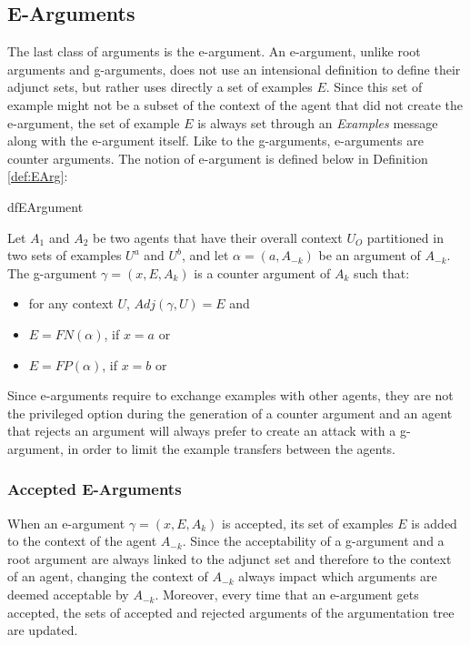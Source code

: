 \subsection{E-Arguments}

The last class of arguments is the e-argument. An e-argument, unlike root arguments and g-arguments, does not use an intensional definition to define their adjunct sets, but rather uses directly a set of examples $E$. Since this set of example might not be a subset of the context of the agent that did not create the e-argument, the set of example $E$ is always set through an \emph{Examples} message along with the e-argument itself. Like to the g-arguments, e-arguments are counter arguments. The notion of e-argument is defined below in Definition \ref{def:EArg}:

\begin{restatable}[E-Argument]{df}{EArgument}
\label{def:EArg}

Let $A_{1}$ and $A_{2}$ be two agents that have their overall context $U_{O}$ partitioned in two sets of examples $U^{a}$ and $U^{b}$, and let $\alpha = (a,A_{-k})$ be an argument of $A_{-k}$. The g-argument $\gamma = (x,E,A_{k})$ is a counter argument of $A_{k}$ such that: 

\begin{itemize}
    \item for any context $U$, $Adj(\gamma,U) = E$ and
    \item $E = FN(\alpha)$, if $x = a$ or
    \item $E = FP(\alpha)$, if $x = b$ or
\end{itemize}

\end{restatable}

Since e-arguments require to exchange examples with other agents, they are not the privileged option during the generation of a counter argument and an agent that rejects an argument will always prefer to create an attack with a g-argument, in order to limit the example transfers between the agents.

\subsubsection{Accepted E-Arguments}

When an e-argument $\gamma = (x,E,A_{k})$ is accepted, its set of examples $E$ is added to the context of the agent $A_{-k}$. Since the acceptability of a g-argument and a root argument are always linked to the adjunct set and therefore to the context of an agent, changing the context of $A_{-k}$ always impact which arguments are deemed acceptable by $A_{-k}$. Moreover, every time that an e-argument gets accepted, the sets of accepted and rejected arguments of the argumentation tree are updated.

